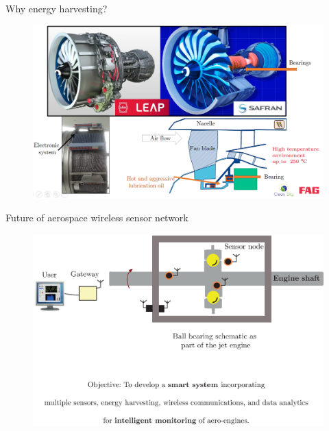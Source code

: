 \documentclass[LaTeX2e,10pt]{beamer}
\begin{document}
\begin{frame}{Why energy harvesting?}
\vskip-5pt %
\begin{figure}[h!]
	\centering
		\includegraphics[width=1.1\linewidth]{./Images/EngineParts.png}
\end{figure}
\end{frame}
\begin{frame}{Future of aerospace wireless sensor network}
\vskip-5pt %
\begin{figure}[h!]
	\centering
		\includegraphics[width=\linewidth]{./Images/I2BS-0.eps}
\end{figure}
\end{frame}
\end{document}
